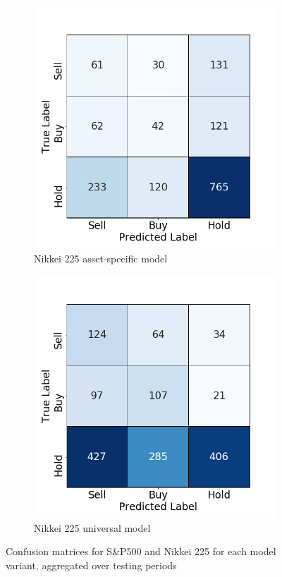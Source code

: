 \documentclass[12pt, a4paper]{article}
\begin{document}
\begin{figure}[H]
\begin{subfigure}{.5\textwidth}
  \centering
  \includegraphics[width=.75\linewidth]{images/CMs/CM_indiv_N225.png}  
  \caption{Nikkei 225 asset-specific model}
  \label{fig:subN225I}
\end{subfigure}
\begin{subfigure}{.5\textwidth}
  \centering
  \includegraphics[width=.75\linewidth]{images/CMs/CM_univ_N225.png}  
  \caption{Nikkei 225 universal model}
  \label{fig:subN225U}
\end{subfigure}

\caption{Confusion matrices for S\&P500 and Nikkei 225 for each model variant, aggregated over testing periods}
\label{fig:AppCMs1}
\end{figure}
\end{document}
